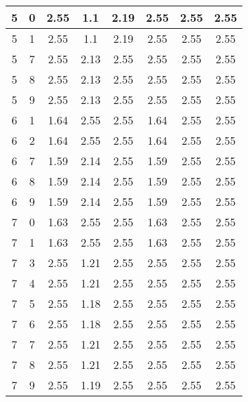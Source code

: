 \begin{longtable}{|c|c||c||c|c||c|c|c|}
	5 & 0 & 2.55 & 1.1 & 2.19 & 2.55 & 2.55 & 2.55 \\ \hline
	5 & 1 & 2.55 & 1.1 & 2.19 & 2.55 & 2.55 & 2.55 \\ \hline
	5 & 7 & 2.55 & 2.13 & 2.55 & 2.55 & 2.55 & 2.55 \\ \hline
	5 & 8 & 2.55 & 2.13 & 2.55 & 2.55 & 2.55 & 2.55 \\ \hline
	5 & 9 & 2.55 & 2.13 & 2.55 & 2.55 & 2.55 & 2.55 \\ \hline
	6 & 1 & 1.64 & 2.55 & 2.55 & 1.64 & 2.55 & 2.55 \\ \hline
	6 & 2 & 1.64 & 2.55 & 2.55 & 1.64 & 2.55 & 2.55 \\ \hline
	6 & 7 & 1.59 & 2.14 & 2.55 & 1.59 & 2.55 & 2.55 \\ \hline
	6 & 8 & 1.59 & 2.14 & 2.55 & 1.59 & 2.55 & 2.55 \\ \hline
	6 & 9 & 1.59 & 2.14 & 2.55 & 1.59 & 2.55 & 2.55 \\ \hline
	7 & 0 & 1.63 & 2.55 & 2.55 & 1.63 & 2.55 & 2.55 \\ \hline
	7 & 1 & 1.63 & 2.55 & 2.55 & 1.63 & 2.55 & 2.55 \\ \hline
	7 & 3 & 2.55 & 1.21 & 2.55 & 2.55 & 2.55 & 2.55 \\ \hline
	7 & 4 & 2.55 & 1.21 & 2.55 & 2.55 & 2.55 & 2.55 \\ \hline
	7 & 5 & 2.55 & 1.18 & 2.55 & 2.55 & 2.55 & 2.55 \\ \hline
	7 & 6 & 2.55 & 1.18 & 2.55 & 2.55 & 2.55 & 2.55 \\ \hline
	7 & 7 & 2.55 & 1.21 & 2.55 & 2.55 & 2.55 & 2.55 \\ \hline
	7 & 8 & 2.55 & 1.21 & 2.55 & 2.55 & 2.55 & 2.55 \\ \hline
	7 & 9 & 2.55 & 1.19 & 2.55 & 2.55 & 2.55 & 2.55 \\ \hline
\end{longtable}

